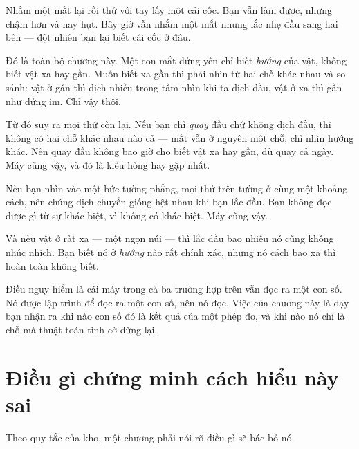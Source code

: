 \documentclass[../../vslam.tex]{subfiles}
\begin{document}
\begin{dongian}
Nhắm một mắt lại rồi thử với tay lấy một cái cốc. Bạn vẫn làm được, nhưng chậm hơn và hay hụt. Bây giờ vẫn nhắm một mắt nhưng lắc nhẹ đầu sang hai bên --- đột nhiên bạn lại biết cái cốc ở đâu.

Đó là toàn bộ chương này. Một con mắt đứng yên chỉ biết \emph{hướng} của vật, không biết vật xa hay gần. Muốn biết xa gần thì phải nhìn từ hai chỗ khác nhau và so sánh: vật ở gần thì dịch nhiều trong tầm nhìn khi ta dịch đầu, vật ở xa thì gần như đứng im. Chỉ vậy thôi.

Từ đó suy ra mọi thứ còn lại. Nếu bạn chỉ \emph{quay} đầu chứ không dịch đầu, thì không có hai chỗ khác nhau nào cả --- mắt vẫn ở nguyên một chỗ, chỉ nhìn hướng khác. Nên quay đầu không bao giờ cho biết vật xa hay gần, dù quay cả ngày. Máy cũng vậy, và đó là kiểu hỏng hay gặp nhất.

Nếu bạn nhìn vào một bức tường phẳng, mọi thứ trên tường ở cùng một khoảng cách, nên chúng dịch chuyển giống hệt nhau khi bạn lắc đầu. Bạn không đọc được gì từ sự khác biệt, vì không có khác biệt. Máy cũng vậy.

Và nếu vật ở rất xa --- một ngọn núi --- thì lắc đầu bao nhiêu nó cũng không nhúc nhích. Bạn biết nó ở \emph{hướng} nào rất chính xác, nhưng nó cách bao xa thì hoàn toàn không biết.

Điều nguy hiểm là cái máy trong cả ba trường hợp trên vẫn đọc ra một con số. Nó được lập trình để đọc ra một con số, nên nó đọc. Việc của chương này là dạy bạn nhận ra khi nào con số đó là kết quả của một phép đo, và khi nào nó chỉ là chỗ mà thuật toán tình cờ dừng lại.

\end{dongian}

\section{Điều gì chứng minh cách hiểu này sai}

Theo quy tắc của kho, một chương phải nói rõ điều gì sẽ bác bỏ nó.
\end{document}
